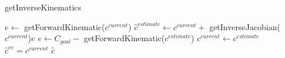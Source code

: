   \begin{algorithm}
  \caption{getInverseKinematics}
  \label{algo:newton_raphson} 
  \DontPrintSemicolon
  $e\gets$ getForwardKinematic($c^{current}$)\;
  {
    $\hat{c}^{estimate} \gets c^{current}+$ getInverseJacobian($c^{current}$)$e$\;\label{ln:newton_raphson_inverse_jacobian}
    $e \gets C_{goal}-$ getForwardKinematic({$c^{estimate}$})\;
    $c^{current} \gets c^{estimate}$\;
  }
    $\hat{c}^{ee}=c^{current}$\;
    \KwRet $\hat{c}$\;

  \end{algorithm}
%

